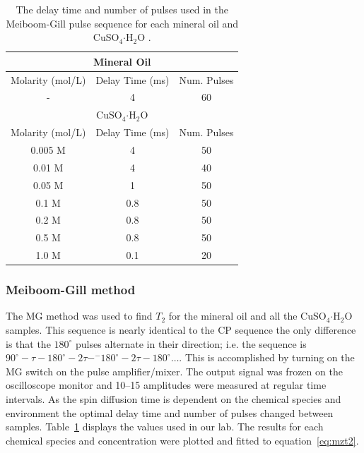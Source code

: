 \documentclass[
reprint,
amsmath,amssymb,
aps,
tikz,
border=5pt
]{revtex4-1}
\newcommand*{\cuso}[1][]{CuSO$_{4} \boldsymbol{\cdot} $H$_2$O }
\begin{document}
    \begin{table}
    \begin{center}
    \begin{tabular}[t]{ |c|c|c| }
        \hline
        \multicolumn{3}{|c|}{Mineral Oil} \\ \hline 
        Molarity (mol/L) & Delay Time (ms) & Num. Pulses \\ \hline
        - & 4 & 60 \\ \hline 
    
        \multicolumn{3}{|c|}{CuSO$_{4} \boldsymbol{\cdot} $H$_2$O} \\ \hline
        Molarity (mol/L) & Delay Time (ms) & Num. Pulses \\ \hline
        0.005 M & 4 & 50 \\ \hline 
        0.01 M & 4 & 40  \\ \hline
        0.05 M & 1 & 50  \\ \hline 
        0.1 M & 0.8 & 50  \\ \hline
        0.2 M & 0.8 & 50  \\ \hline 
        0.5 M & 0.8 & 50  \\ \hline
        1.0 M & 0.1 & 20  \\ \hline 
    \end{tabular}
    \caption{The delay time and number of pulses used in the Meiboom-Gill pulse sequence for each mineral oil and \cuso. }
    \label{tab:delaytime}
    \end{center}
    \end{table}

\subsubsection*{Meiboom-Gill method}

    The MG method was used to find $T_2$ for the mineral oil and all the \cuso samples. This sequence is nearly identical to the CP sequence the only difference is that the $180^\circ$ pulses alternate in their direction; i.e. the sequence is $90^{\circ}- \tau  - 180^{\circ}-2\tau- ^{-}180^{\circ}-2\tau- 180^{\circ}\dots$. This is accomplished by turning on the MG switch on the pulse amplifier/mixer. The output signal was frozen on the oscilloscope monitor and 10--15 amplitudes were measured at regular time intervals. As the spin diffusion time is dependent on the chemical species and environment the optimal delay time and number of pulses changed between samples. Table~\ref{tab:delaytime} displays the values used in our lab. The results for each chemical species and concentration were plotted and fitted to equation~\ref{eq:mzt2}.
\end{document}
